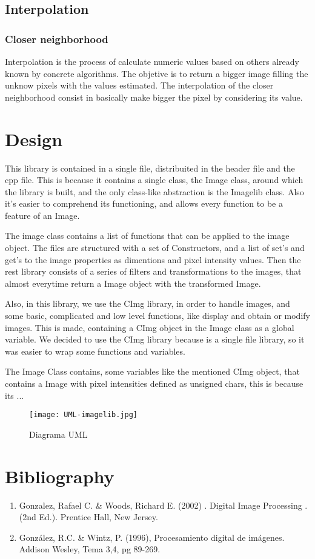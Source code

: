 \documentclass[a4paper]{article}
\begin{document}
\subsection{Interpolation}
\subsubsection{Closer neighborhood}

Interpolation is the process of calculate numeric values based on others already known by concrete algorithms. The objetive is to return a bigger image filling the unknow pixels with the values estimated.
The interpolation of the closer neighborhood consist in basically make bigger the pixel by considering its value.


\section{Design}
	This library is contained in a single file, distribuited in the header file and the cpp file. This is because it contains a single class, the Image class, around which the library is built, and the only class-like abstraction is the Imagelib class. Also it's easier to comprehend its functioning, and allows every function to be a feature of an Image. 
    
    The image class contains a list of functions that can be applied to the image object. The files are structured with a set of Constructors, and a list of set's and get's to the image properties as dimentions and pixel intensity values. Then the rest library consists of a series of filters and transformations to the images, that almost everytime return a Image object with the transformed Image.
    
    Also, in this library, we use the CImg library, in order to handle images, and some basic, complicated and low level functions, like display and  obtain or modify images. This is made, containing a CImg object in the Image class as a global variable. We decided to use the CImg library because is a single file library, so it was easier to wrap some functions and variables. 
    
    The Image Class contains, some variables like the mentioned CImg object, that contains a Image with pixel intensities defined as unsigned chars, this is because its ...
    


\begin{figure}
\texttt{[image: UML-imagelib.jpg]}

\caption{Diagrama UML}
\end{figure}

\section{Bibliography}

\begin{enumerate}
\item Gonzalez, Rafael C. \& Woods, Richard E. (2002) . Digital Image Processing . (2nd Ed.). Prentice Hall, New Jersey.

\item González, R.C. \& Wintz, P. (1996), Procesamiento digital de imágenes. Addison Wesley, Tema 3,4, pg 89-269.
\end{enumerate}
\end{document}
